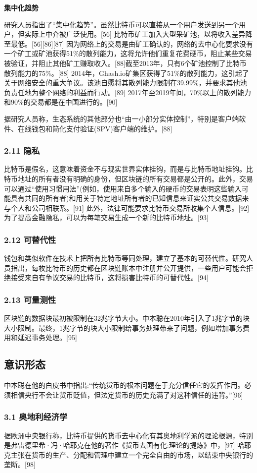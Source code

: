 \textbf{集中化趋势}

研究人员指出了“集中化趋势”。虽然比特币可以直接从一个用户发送到另一个用户，但实际上中介被广泛使用。[56] 比特币矿工加入大型采矿池，以将收入差异降至最低。[56][86][87] 因为网络上的交易是由矿工确认的，网络的去中心化要求没有一个矿工或矿池获得51\%的散列能力，这将允许他们重复花费硬币，阻止某些交易被验证，并阻止其他矿工赚取收入。[88]截至2013年，只有6个矿池控制了比特币散列能力的75\%。[88] 2014年，Ghash.io矿集区获得了51\%的散列能力，这引起了关于网络安全的重大争议。该池自愿将其散列能力限制在39.99\%，并要求其他池负责任地为整个网络的利益而行动。[89] 2017年至2019年间，70\%以上的散列能力和90\%的交易都是在中国进行的。[90]

据研究人员称，生态系统的其他部分也“由一小部分实体控制”，特别是客户端软件、在线钱包和简化支付验证(SPV)客户端的维护。[88]
\subsubsection{2.11 隐私}
比特币是假名，这意味着资金不与现实世界实体挂钩，而是与比特币地址挂钩。比特币地址的所有者没有明确的身份，但区块链的所有交易都是公开的。此外，交易可以通过“使用习惯用法”(例如，使用来自多个输入的硬币的交易表明这些输入可能具有共同的所有者)和用关于特定地址所有者的已知信息来证实公共交易数据来与个人和公司相联系。[91] 此外，法律可能要求比特币交易所收集个人信息。[92] 为了提高金融隐私，可以为每笔交易生成一个新的比特币地址。[93]
\subsubsection{2.12 可替代性}
钱包和类似软件在技术上把所有比特币等同处理，建立了基本的可替代性。研究人员指出，每枚比特币的历史都在区块链账本中注册并公开提供，一些用户可能会拒绝接受来自有争议交易的比特币，这将损害比特币的可替代性。[94]
\subsubsection{2.13 可量测性}
区块链的数据块最初被限制在32兆字节大小。中本聪在2010年引入了1兆字节的块大小限制。最终，1兆字节的块大小限制给事务处理带来了问题，例如增加事务费用和延迟事务处理。[95]

\subsection{意识形态}
中本聪在他的白皮书中指出:“传统货币的根本问题在于充分信任它的发挥作用。必须相信央行不会让货币贬值，但法定货币的历史充满了对这种信任的违背。”[96]
\subsubsection{3.1 奥地利经济学}
据欧洲中央银行称，比特币提供的货币去中心化有其奥地利学派的理论根源，特别是弗雷德里希·冯·哈耶克在他的著作《货币去国有化:理论的提炼》中，[97] 哈耶克主张在货币的生产、分配和管理中建立一个完全自由的市场，以结束中央银行的垄断。[98]
